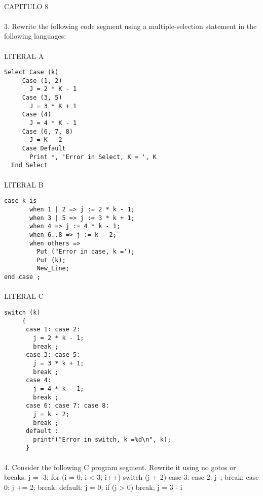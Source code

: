 \documentclass[../main.tex]{subfiles}
\begin{document}
\paragraph{ }CAPITULO 8
\paragraph{ }
3. Rewrite the following code segment using a multiple-selection statement in the following languages:
\paragraph{ }LITERAL A
\begin{lstlisting}[frame=single]
  Select Case (k) 
     Case (1, 2) 
       J = 2 * K - 1 
     Case (3, 5) 
       J = 3 * K + 1 
     Case (4) 
       J = 4 * K - 1 
     Case (6, 7, 8) 
       J = K - 2 
     Case Default 
       Print *, 'Error in Select, K = ', K 
  End Select 

\end{lstlisting}
\paragraph{ }LITERAL B
\begin{lstlisting}[frame=single]
case k is 
       when 1 | 2 => j := 2 * k - 1; 
       when 3 | 5 => j := 3 * k + 1; 
       when 4 => j := 4 * k - 1; 
       when 6..8 => j := k - 2; 
       when others => 
         Put ("Error in case, k ='); 
         Put (k); 
         New_Line; 
end case ; 
\end{lstlisting}
\paragraph{ }LITERAL C
\begin{lstlisting}[frame=single]
switch (k) 
     { 
      case 1: case 2: 
        j = 2 * k - 1; 
        break ; 
      case 3: case 5: 
        j = 3 * k + 1; 
        break ; 
      case 4: 
        j = 4 * k - 1; 
        break ; 
      case 6: case 7: case 8: 
        j = k - 2; 
        break ; 
      default : 
        printf("Error in switch, k =%d\n", k); 
      } 
\end{lstlisting}

\paragraph{ }
 4. Consider the following C program segment. Rewrite it using no gotos or breaks.
j = -3; for (i = 0; i < 3; i++) {  switch (j + 2) {    case 3:    case 2: j--; break;    case 0: j += 2; break;    default: j = 0;  }  if (j > 0) break;  j = 3 - i }
\end{document}
